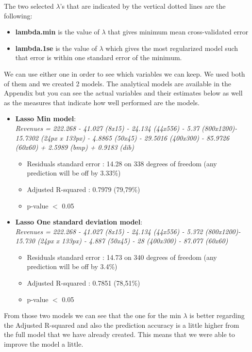 \documentclass{book}
\begin{document}
The two selected $\lambda$’s that are indicated by the vertical dotted lines are the following:
\begin{itemize}
 \item \textbf{lambda.min} is the value of $\lambda$ that gives minimum mean cross-validated error
 \item \textbf{lambda.1se} is the value of $\lambda$ which gives the most regularized model such that error is within one standard error of the minimum.
 \end{itemize}  
We can use either one in order to see which variables we can keep. We used both of them and we created 2 models. The analytical models are available in the Appendix but you can see the actual variables and their estimates below as well as the measures that indicate how well performed are the models.
\begin{itemize}
\item \textbf{Lasso Min model}:\\
\textit{Revenues = 222.268 - 41.027 (8x15) - 24.134 (44x556) - 5.37 (800x1200)- 15.7302 (24px x 133px) - 4.8865 (50x45) - 29.5016 (400x300) - 85.9726 (60x60) + 2.5989 (bmp) + 0.9183 (dib)}\\
\begin{itemize}
\item Residuals standard error : 14.28 on 338 degrees of freedom (any prediction will be off by 3.33\%)
\item Adjusted R-squared : 0.7979 (79,79\%)
\item p-value $<$ 0.05
\end{itemize}

\item \textbf{Lasso One standard deviation model}:\\
\textit{Revenues = 222.268 - 41.027 (8x15) - 24.134 (44x556) - 5.372 (800x1200)- 15.730 (24px x 133px) - 4.887 (50x45) - 28 (400x300) - 87.077 (60x60)}
\begin{itemize}
\item Residuals standard error : 14.73 on 340 degrees of freedom (any prediction will be off by 3.4\%)
\item Adjusted R-squared : 0.7851 (78,51\%)
\item p-value $<$ 0.05
\end{itemize}
\end{itemize}
From those two models we can see that the one for the min $\lambda$ is better regarding the Adjusted R-squared and also the prediction accuracy is a little higher from the full model that we have already created. This means that we were able to improve the model a little.
\end{document}
